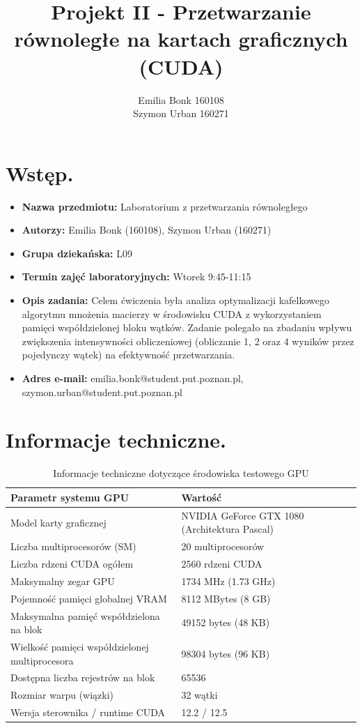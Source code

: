 \documentclass[10pt]{article}
\title{Projekt II - Przetwarzanie równoległe na kartach graficznych (CUDA)}
\author{Emilia Bonk 160108 \\ Szymon Urban 160271}
\date{}
\begin{document}
\maketitle

\section*{Wstęp.}

\begin{itemize}
\item \textbf{Nazwa przedmiotu:} Laboratorium z przetwarzania równoległego
\item \textbf{Autorzy:} Emilia Bonk (160108), Szymon Urban (160271)
\item \textbf{Grupa dziekańska:} L09
\item \textbf{Termin zajęć laboratoryjnych:} Wtorek 9:45-11:15
\item \textbf{Opis zadania:}
Celem ćwiczenia była analiza optymalizacji kafelkowego algorytmu mnożenia macierzy w środowisku CUDA z wykorzystaniem pamięci współdzielonej bloku wątków. Zadanie polegało na zbadaniu wpływu zwiększenia intensywności obliczeniowej (obliczanie 1, 2 oraz 4 wyników przez pojedynczy wątek) na efektywność przetwarzania.
\item \textbf{Adres e-mail:} emilia.bonk@student.put.poznan.pl, szymon.urban@student.put.poznan.pl
\end{itemize}

\section{Informacje techniczne.}

\begin{table}[h!]
\centering
\begin{tabular}{|l|l|}
\hline
\textbf{Parametr systemu GPU} & \textbf{Wartość} \\
\hline
Model karty graficznej & NVIDIA GeForce GTX 1080 (Architektura Pascal) \\
\hline
Liczba multiprocesorów (SM) & 20 multiprocesorów \\
\hline
Liczba rdzeni CUDA ogółem & 2560 rdzeni CUDA \\
\hline
Maksymalny zegar GPU & 1734 MHz (1.73 GHz) \\
\hline
Pojemność pamięci globalnej VRAM & 8112 MBytes (8 GB) \\
\hline
Maksymalna pamięć współdzielona na blok & 49152 bytes (48 KB) \\
\hline
Wielkość pamięci współdzielonej multiprocesora & 98304 bytes (96 KB) \\
\hline
Dostępna liczba rejestrów na blok & 65536 \\
\hline
Rozmiar warpu (wiązki) & 32 wątki \\
\hline
Wersja sterownika / runtime CUDA & 12.2 / 12.5 \\
\hline
\end{tabular}
\caption{Informacje techniczne dotyczące środowiska testowego GPU}
\end{table}
\end{document}
